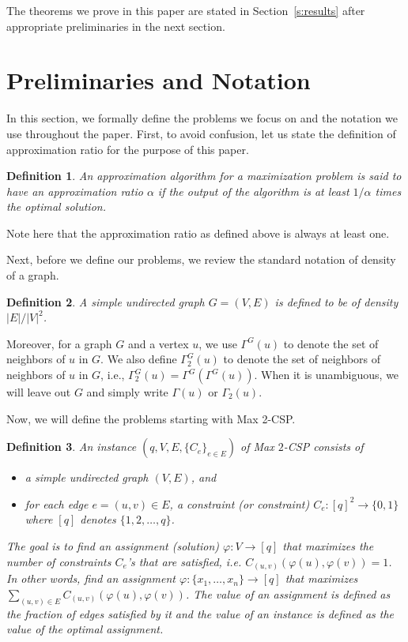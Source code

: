\documentclass{article}
\newtheorem{definition}{Definition}
\begin{document}
The theorems we prove in this paper are stated in Section~\ref{s:results} after appropriate preliminaries in the next section.

\section{Preliminaries and Notation}

In this section, we formally define the problems we focus on and the notation we use throughout the paper. First, to avoid confusion, let us state the definition of approximation ratio for the purpose of this paper. \\

\begin{definition}
  An approximation algorithm for a maximization problem is said to have an approximation ratio $\alpha$ if the output of the algorithm is at least $1/\alpha$ times the optimal solution.
\end{definition}

Note here that the approximation ratio as defined above is always at least one.

Next, before we define our problems, we review the standard notation of density of a graph. \\

\begin{definition}
  A simple undirected graph $G = (V, E)$ is defined to be of density $|E|/|V|^2$.
\end{definition}

Moreover, for a graph $G$ and a vertex $u$, we use $\Gamma^G(u)$ to denote the set of neighbors of $u$ in $G$. We also define $\Gamma_2^G(u)$ to denote the set of neighbors of neighbors of $u$ in $G$, i.e., $\Gamma_2^G(u) = \Gamma^G(\Gamma^G(u))$. When it is unambiguous, we will leave out $G$ and simply write $\Gamma(u)$ or $\Gamma_2(u)$.

Now, we will define the problems starting with {\sc Max 2-CSP}. \\

\begin{definition}
An instance $(q, V, E, \{C_e\}_{e \in E})$ of {\sc Max $2$-CSP} consists of
\begin{itemize}
  \item a simple undirected graph $(V, E)$, and
  \item for each edge $e = (u, v) \in E$, a constraint (or constraint) $C_e: [q]^2 \to \{0, 1\}$ where $[q]$ denotes $\{1, 2, \dots, q\}$.
\end{itemize}
The goal is to find an assignment (solution) $\varphi: V \to [q]$ that maximizes the number of constraints $C_e$'s that are satisfied, i.e. $C_{(u, v)}(\varphi(u), \varphi(v)) = 1$. In other words, find an assignment $\varphi: \{x_1, \dots, x_n\} \to [q]$ that maximizes $\sum_{(u, v) \in E} C_{(u, v)}(\varphi(u), \varphi(v))$. The value of an assignment is defined as the fraction of edges satisfied by it and the value of an instance is defined as the value of the optimal assignment.
\end{definition}
\end{document}
